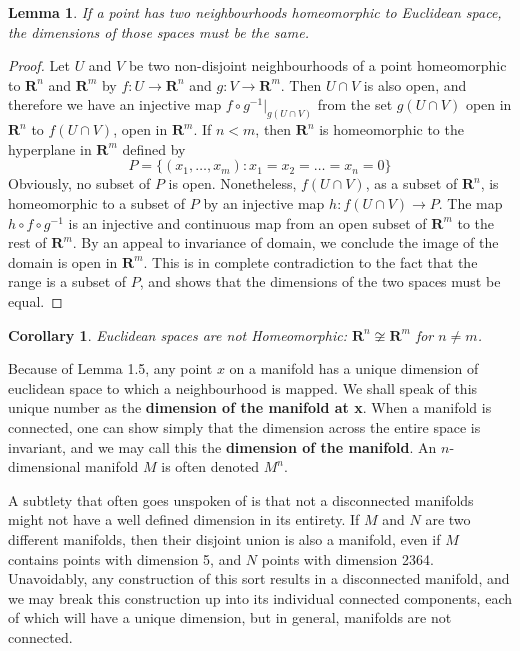 \documentclass[12pt]{report}
\theoremstyle{plain}
\newtheorem{lemma}[theorem]{Lemma}
\newtheorem{corollary}[theorem]{Corollary}
\theoremstyle{definition}
\begin{document}
\begin{lemma}
    If a point has two neighbourhoods homeomorphic to Euclidean space, the dimensions of those spaces must be the same.
\end{lemma}
\begin{proof}
    Let $U$ and $V$ be two non-disjoint neighbourhoods of a point homeomorphic to $\mathbf{R}^n$ and $\mathbf{R}^m$ by $f:U \to \mathbf{R}^n$ and $g:V \to \mathbf{R}^m$. Then $U \cap V$ is also open, and therefore we have an injective map $f \circ g^{-1}|_{g(U \cap V)}$ from the set $g(U \cap V)$ open in $\mathbf{R}^n$ to $f(U \cap V)$, open in $\mathbf{R}^m$. If $n < m$, then $\mathbf{R}^n$ is homeomorphic to the hyperplane in $\mathbf{R}^m$ defined by
    \[ P = \{ (x_1, \dots, x_m): x_1 = x_2 = \dots = x_n = 0 \} \]
    Obviously, no subset of $P$ is open. Nonetheless, $f(U \cap V)$, as a subset of $\mathbf{R}^n$, is homeomorphic to a subset of $P$ by an injective map $h: f(U \cap V) \to P$. The map $h \circ f \circ g^{-1}$ is an injective and continuous map from an open subset of $\mathbf{R}^m$ to the rest of $\mathbf{R}^m$. By an appeal to invariance of domain, we conclude the image of the domain is open in $\mathbf{R}^m$. This is in complete contradiction to the fact that the range is a subset of $P$, and shows that the dimensions of the two spaces must be equal.
\end{proof}

\begin{corollary}
    Euclidean spaces are not Homeomorphic: $\mathbf{R}^n \not \cong \mathbf{R}^m$ for $n \neq m$.
\end{corollary}

Because of Lemma 1.5, any point $x$ on a manifold has a unique dimension of euclidean space to which a neighbourhood is mapped. We shall speak of this unique number as the {\bf dimension of the manifold at x}. When a manifold is connected, one can show simply that the dimension across the entire space is invariant, and we may call this the {\bf dimension of the manifold}. An $n$-dimensional manifold $M$ is often denoted $M^n$.

A subtlety that often goes unspoken of is that not a disconnected manifolds might not have a well defined dimension in its entirety. If $M$ and $N$ are two different manifolds, then their disjoint union is also a manifold, even if $M$ contains points with dimension 5, and $N$ points with dimension 2364. Unavoidably, any construction of this sort results in a disconnected manifold, and we may break this construction up into its individual connected components, each of which will have a unique dimension, but in general, manifolds are not connected.
\end{document}
